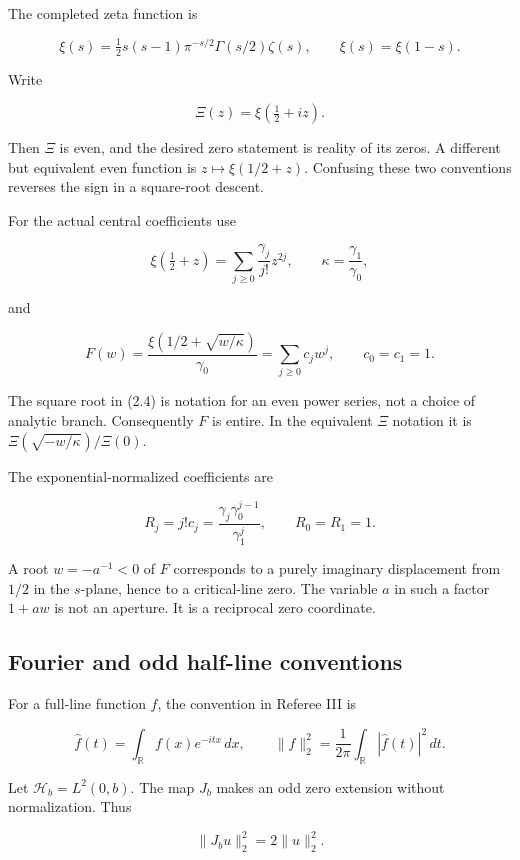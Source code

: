 \documentclass[
  10pt,
  a4paper,
  10pt,
  oneside,
  openany]{book}
\begin{document}
The completed zeta function is

\[
\xi(s)=\tfrac12s(s-1)\pi^{-s/2}\Gamma(s/2)\zeta(s),
\qquad \xi(s)=\xi(1-s).
\tag{2.1}\label{eq:2.1}
\]

Write

\[
\Xi(z)=\xi(\tfrac12+iz).
\tag{2.2}\label{eq:2.2}
\]

Then \(\Xi\) is even, and the desired zero statement is reality of its
zeros. A different but equivalent even function is
\(z\mapsto\xi(1/2+z)\). Confusing these two conventions reverses the
sign in a square-root descent.

For the actual central coefficients use

\[
\xi(\tfrac12+z)=\sum_{j\ge0}\frac{\gamma_j}{j!}z^{2j},
\qquad \kappa=\frac{\gamma_1}{\gamma_0},
\tag{2.3}\label{eq:2.3}
\]

and

\[
F(w)=\frac{\xi(1/2+\sqrt{w/\kappa})}{\gamma_0}
     =\sum_{j\ge0}c_jw^j,
\qquad c_0=c_1=1.
\tag{2.4}\label{eq:2.4}
\]

The square root in (2.4) is notation for an even power series, not a
choice of analytic branch. Consequently \(F\) is entire. In the
equivalent \(\Xi\) notation it is \(\Xi(\sqrt{-w/\kappa})/\Xi(0)\).

The exponential-normalized coefficients are

\[
R_j=j!c_j
=\frac{\gamma_j\gamma_0^{j-1}}{\gamma_1^j},
\qquad R_0=R_1=1.
\tag{2.5}\label{eq:2.5}
\]

A root \(w=-a^{-1}<0\) of \(F\) corresponds to a purely imaginary
displacement from \(1/2\) in the \(s\)-plane, hence to a critical-line
zero. The variable \(a\) in such a factor \(1+aw\) is not an aperture.
It is a reciprocal zero coordinate.

\subsection{Fourier and odd half-line
conventions}\label{fourier-and-odd-half-line-conventions}

For a full-line function \(f\), the convention in Referee III is

\[
\widehat f(t)=\int_{\mathbb R}f(x)e^{-itx}\,dx,
\qquad
\|f\|_2^2=\frac1{2\pi}\int_{\mathbb R}|\widehat f(t)|^2\,dt.
\tag{2.6}\label{eq:2.6}
\]

Let \(\mathcal H_b=L^2(0,b)\). The map \(J_b\) makes an odd zero
extension without normalization. Thus

\[
\|J_bu\|_2^2=2\|u\|_2^2.
\tag{2.7}\label{eq:2.7}
\]
\end{document}
